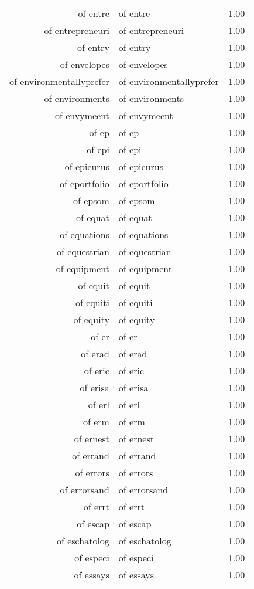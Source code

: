 \begin{table}[ht]
\begin{tabular}{rlr}
  of entre & of entre & 1.00 \\ 
  of entrepreneuri & of entrepreneuri & 1.00 \\ 
  of entry & of entry & 1.00 \\ 
  of envelopes & of envelopes & 1.00 \\ 
  of environmentallyprefer & of environmentallyprefer & 1.00 \\ 
  of environments & of environments & 1.00 \\ 
  of envymeent & of envymeent & 1.00 \\ 
  of ep & of ep & 1.00 \\ 
  of epi & of epi & 1.00 \\ 
  of epicurus & of epicurus & 1.00 \\ 
  of eportfolio & of eportfolio & 1.00 \\ 
  of epsom & of epsom & 1.00 \\ 
  of equat & of equat & 1.00 \\ 
  of equations & of equations & 1.00 \\ 
  of equestrian & of equestrian & 1.00 \\ 
  of equipment & of equipment & 1.00 \\ 
  of equit & of equit & 1.00 \\ 
  of equiti & of equiti & 1.00 \\ 
  of equity & of equity & 1.00 \\ 
  of er & of er & 1.00 \\ 
  of erad & of erad & 1.00 \\ 
  of eric & of eric & 1.00 \\ 
  of erisa & of erisa & 1.00 \\ 
  of erl & of erl & 1.00 \\ 
  of erm & of erm & 1.00 \\ 
  of ernest & of ernest & 1.00 \\ 
  of errand & of errand & 1.00 \\ 
  of errors & of errors & 1.00 \\ 
  of errorsand & of errorsand & 1.00 \\ 
  of errt & of errt & 1.00 \\ 
  of escap & of escap & 1.00 \\ 
  of eschatolog & of eschatolog & 1.00 \\ 
  of especi & of especi & 1.00 \\ 
  of essays & of essays & 1.00 \\ 

\end{tabular}
\end{table}
